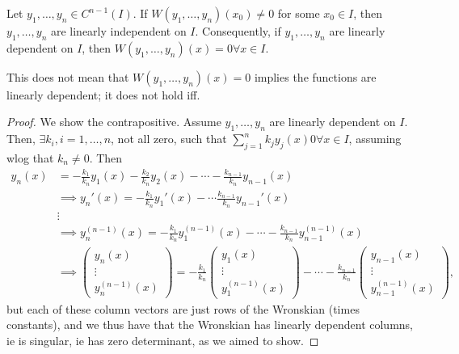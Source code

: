 \begin{theorem}
    Let $y_1, \dots, y_n \in C^{n-1}(I)$. If $W(y_1, \dots, y_n)(x_0) \neq 0$ for some $x_0 \in I$, then $y_1, \dots, y_n$ are linearly independent on $I$. Consequently, if $y_1, \dots, y_n$ are linearly dependent on $I$, then $W(y_1, \dots, y_n)(x) = 0 \forall x \in I$.
\end{theorem}

\begin{remark}
    This does not mean that $W(y_1, \dots, y_n)(x) = 0$ implies the functions are linearly dependent; it does not hold iff.
\end{remark}

\begin{proof}
    We show the contrapositive. Assume $y_1, \dots, y_n$ are linearly dependent on $I$. Then, $\exists k_i, i = 1, \dots, n$, not all zero, such that $\sum_{j=1}^n k_j y_j(x)  0 \forall x \in I$, assuming wlog that $k_n \neq 0$. Then \begin{align*}
        y_n(x) &= -\frac{k_1}{k_n}y_1(x) - \frac{k_2}{k_n}y_2(x) - \cdots - \frac{k_{n-1}}{k_n} y_{n-1}(x)\\
        &\implies y_n'(x) = -\frac{k_1}{k_n}y_1'(x) - \cdots  \frac{k_{n-1}}{k_n} y_{n-1}'(x)\\
        &\vdots\\
        &\implies y_n^{(n-1)}(x) = -\frac{k_1}{k_n}y_1^{(n-1)}(x) - \cdots - \frac{k_{n-1}}{k_n}y_{n-1}^{(n-1)}(x)\\
        &\implies \begin{pmatrix}
            y_n(x) \\
            \vdots\\
            y_n^{(n-1)}(x)
        \end{pmatrix} =  -\frac{k_1}{k_n} \begin{pmatrix}
            y_1(x)\\
            \vdots\\
            y_1^{(n-1)}(x)
        \end{pmatrix} - \cdots - \frac{k_{n-1}}{k_n} \begin{pmatrix}
            y_{n-1}(x)\\
            \vdots \\
            y_{n-1}^{(n-1)}(x)
        \end{pmatrix},
    \end{align*}
    but each of these column vectors are just rows of the Wronskian (times constants), and we thus have that the Wronskian has linearly dependent columns, ie is singular, ie has zero determinant, as we aimed to show.
\end{proof}


